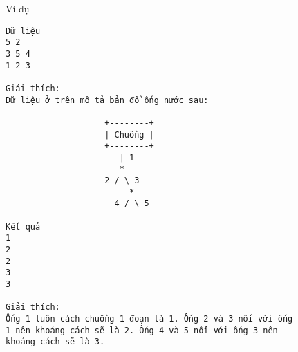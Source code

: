 Ví dụ
\begin{verbatim}
Dữ liệu
5 2
3 5 4
1 2 3

Giải thích:
Dữ liệu ở trên mô tả bản đồ ống nước sau:

                    +--------+
                    | Chuồng |
                    +--------+
                       | 1
                       *
                    2 / \ 3
                         *
                      4 / \ 5

Kết quả
1
2
2
3
3

Giải thích:
Ống 1 luôn cách chuồng 1 đoạn là 1. Ống 2 và 3 nối với ống 
1 nên khoảng cách sẽ là 2. Ống 4 và 5 nối với ống 3 nên 
khoảng cách sẽ là 3.
\end{verbatim}